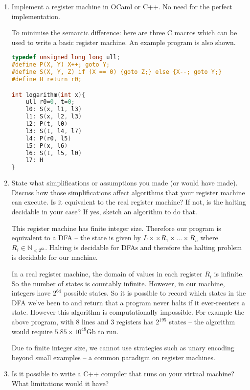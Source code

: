\documentclass[10pt,\jkfside,a4paper]{article}
\begin{document}
\begin{enumerate}[label=(\alph*)]

\item Implement a register machine in OCaml or C++. No need for the perfect
implementation.

To minimise the semantic difference: here are three C macros which can be used
to write a basic register machine. An example program is also shown.

\begin{lstlisting}[language=C]
typedef unsigned long long ull;
#define P(X, Y) X++; goto Y;
#define S(X, Y, Z) if (X == 0) {goto Z;} else {X--; goto Y;}
#define H return r0;

int logarithm(int x){
    ull r0=0, t=0;
    l0: S(x, l1, l3)
    l1: S(x, l2, l3)
    l2: P(t, l0)
    l3: S(t, l4, l7)
    l4: P(r0, l5)
    l5: P(x, l6)
    l6: S(t, l5, l0)
    l7: H
}
\end{lstlisting}

\item State what simplifications or assumptions you made (or would have
made). Discuss how those simplifications affect algorithms that your
register machine can execute. Is it equivalent to the real register
machine? If not, is the halting decidable in your case? If yes, sketch an
algorithm to do that.

This register machine has finite integer size. Therefore our program is
equivalent to a DFA -- the state is given by $L \times  \times R_1 \times
\dots \times R_n$ where $R_i \in \mathbb{N}_{< 2^{64}}$. Halting is
decidable for DFAs and therefore the halting problem is decidable for our
machine.

In a real register machine, the domain of values in each register $R_i$ is
infinite. So the number of states is countably infinite. However, in our
machine, integers have $2^{64}$ possible states. So it is possible to record
which states in the DFA we've been to and return that a program never halts
if it ever-reenters a state. However this algorithm is computationally
impossible. For example the above program, with 8 lines and 3 registers has
$2^{195}$ states -- the algorithm would require $5.85 \times 10^{48}$Gb to run.

Due to finite integer size, we cannot use strategies such as unary encoding
beyond small examples -- a common paradigm on register machines.

\item Is it possible to write a C++ compiler that runs on your virtual
machine? What limitations would it have?


\end{enumerate}
\end{document}
